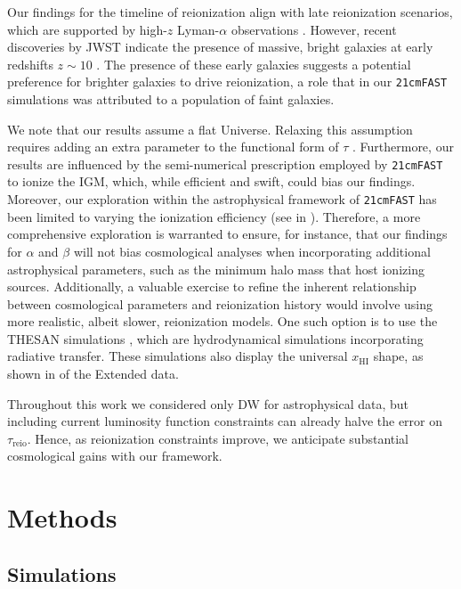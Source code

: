 \documentclass[12pt, a4paper]{article}
\newcommand{\HI}{\mathrm{HI}}
\newcommand{\reio}{\mathrm{reio}}
\begin{document}
Our findings for the timeline of reionization align with late
reionization scenarios, which are supported by high-$z$ Lyman-$\alpha$
observations \cite{Keating2020, Cain2021}.
However, recent discoveries by JWST indicate the presence of massive,
bright galaxies at early redshifts $z \sim 10$ \cite{Adams2023,
Bradley2023, Donnan2023}.
The presence of these early galaxies suggests a potential preference for
brighter galaxies to drive reionization, a role that in our
\texttt{21cmFAST} simulations was attributed to a population of faint
galaxies.

We note that our results assume a flat Universe.
Relaxing this assumption requires adding an extra parameter to the
functional form of $\tau$ \cite{Anselmi2023}.
Furthermore, our results are influenced by the semi-numerical
prescription employed by \texttt{21cmFAST} to ionize the IGM, which,
while efficient and swift, could bias our findings.
Moreover, our exploration within the astrophysical framework of
\texttt{21cmFAST} has been limited to varying the ionization efficiency
(see  in ).
Therefore, a more comprehensive exploration is warranted to ensure, for
instance, that our findings for $\alpha$ and $\beta$ will not bias
cosmological analyses when incorporating additional astrophysical
parameters, such as the minimum halo mass that host ionizing sources.
Additionally, a valuable exercise to refine the inherent relationship
between cosmological parameters and reionization history would involve
using more realistic, albeit slower, reionization models.
One such option is to use the THESAN simulations \cite{Kannan2022},
which are hydrodynamical simulations incorporating radiative transfer. 
These simulations also display the universal $x_\HI$ shape, as shown in
 of the Extended data.

Throughout this work we considered only DW for astrophysical data,
but including current luminosity function constraints can already halve
the error on $\tau_\reio$.
Hence, as reionization constraints improve, we anticipate substantial
cosmological gains with our framework.



\appendix


\section*{Methods}
\label{sec:methods}


\subsection*{Simulations}
\label{sec:sims}
\end{document}
